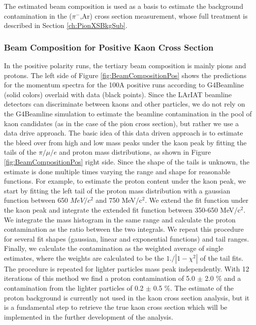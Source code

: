 The estimated beam composition is used as a basis to estimate the background contamination in the  ($\pi^{-}$,Ar) cross section measurement, whose  full treatment is described in Section \ref{ch:PionXSBkgSub}.

\subsubsection{Beam Composition for Positive Kaon Cross Section}\label{ch:protons}
In the positive polarity runs, the tertiary beam composition is mainly pions and protons. The left side of Figure \ref{fig:BeamCompositionPos} shows the  predictions for the momentum spectra for the 100A positive runs  according to  G4Beamline (solid colors) overlaid with data (black points). 
Since the LArIAT beamline detectors can discriminate between kaons and other particles, we do not rely on the G4Beamline simulation to estimate the beamline contamination in the pool of kaon candidates (as in the case of the pion cross section), but rather we use a data drive approach. 
The basic idea of this data driven approach is to estimate the bleed over from high and low mass peaks under the kaon peak by fitting the tails of the $\pi/\mu/e$ and proton mass distributions, as shown in Figure \ref{fig:BeamCompositionPos} right side. 
Since the shape of the tails is unknown, the estimate is done multiple times varying the range and shape for reasonable functions. 
For example, to estimate the proton content under the kaon peak, we start by fitting the left tail of the proton mass distribution with a gaussian function between 650 $MeV/c^2$ and 750 MeV/c$^2$. %
 We extend the fit function under the kaon peak and integrate the extended fit function between 350-650 MeV/c$^2$. We integrate the mass histogram in the same range and calculate the proton contamination as the ratio between the two integrals. We repeat this procedure for several fit shapes (gaussian, linear and exponential functions) and tail ranges. Finally, we calculate the contamination as the weighted average of single estimates, where the weights are calculated to be the $1./|1-\chi^2|$ of the tail fits. The procedure is repeated for lighter particles mass peak independently.
With 12 iterations of this method we find a proton contamination of  5.0 $\pm$ 2.0 \%  and a contamination from the lighter particles of 0.2 $\pm$ 0.5 \%.
The estimate of the proton background is currently not used in the kaon cross section analysis, but it is a fundamental step to retrieve the true kaon cross section which will be implemented in the further development of the analysis.


